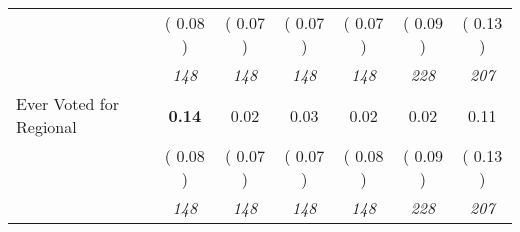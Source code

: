 \begin{tabular}{l c c c c c c}
& (     0.08 ) & (     0.07 ) & (     0.07 ) & (     0.07 ) & (     0.09 ) & (     0.13 ) \\
& \textit{ 148 } & \textit{ 148 } & \textit{ 148 } & \textit{ 148 } & \textit{ 228 } & \textit{ 207 } \\
Ever Voted for Regional & \textbf{      0.14 } &      0.02 &      0.03 &      0.02 &      0.02 &      0.11 \\
& (     0.08 ) & (     0.07 ) & (     0.07 ) & (     0.08 ) & (     0.09 ) & (     0.13 ) \\
& \textit{ 148 } & \textit{ 148 } & \textit{ 148 } & \textit{ 148 } & \textit{ 228 } & \textit{ 207 } \\
\bottomrule
\end{tabular}
